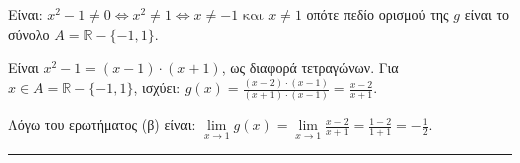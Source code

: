 \begin{alist}
\item Είναι: $x^2 - 1 \neq 0 \Leftrightarrow x^2 \neq 1 \Leftrightarrow x \neq -1 \text{ και } x \neq 1$ οπότε πεδίο ορισμού της $g$ είναι το σύνολο $A = \mathbb{R} - \{-1, 1\}$.

\item Είναι $x^2 - 1 = (x - 1) \cdot (x + 1)$, ως διαφορά τετραγώνων. Για $x \in A = \mathbb{R} - \{-1, 1\}$, ισχύει: $\displaystyle g(x) = \frac{(x - 2) \cdot (x - 1)}{(x + 1) \cdot (x - 1)} = \frac{x - 2}{x + 1}$.

\item Λόγω του ερωτήματος (β) είναι: $\displaystyle \lim\limits_{x \to 1} g(x) = \lim\limits_{x \to 1} \frac{x - 2}{x + 1} = \frac{1 - 2}{1 + 1} = -\frac{1}{2}$.
\end{alist}
\vspace{6mm}
\noindent\rule{\textwidth}{0.4pt}
\vspace{6mm}

